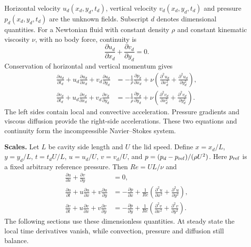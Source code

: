 Horizontal velocity $u_d(x_d,y_d,t_d)$, vertical velocity $v_d(x_d,y_d,t_d)$ and pressure $p_d(x_d,y_d,t_d)$ are the unknown fields. Subscript $d$ denotes dimensional quantities. For a Newtonian fluid with constant density $\rho$ and constant kinematic viscosity $\nu$, with no body force, continuity is
\[
\frac{\partial u_d}{\partial x_d}+\frac{\partial v_d}{\partial y_d}=0.
\]
Conservation of horizontal and vertical momentum gives
\begin{align*}
\frac{\partial u_d}{\partial t_d}+u_d\frac{\partial u_d}{\partial x_d}+v_d\frac{\partial u_d}{\partial y_d}
&=-\frac{1}{\rho}\frac{\partial p_d}{\partial x_d}+\nu\left(\frac{\partial^2u_d}{\partial x_d^2}+\frac{\partial^2u_d}{\partial y_d^2}\right),\\
\frac{\partial v_d}{\partial t_d}+u_d\frac{\partial v_d}{\partial x_d}+v_d\frac{\partial v_d}{\partial y_d}
&=-\frac{1}{\rho}\frac{\partial p_d}{\partial y_d}+\nu\left(\frac{\partial^2v_d}{\partial x_d^2}+\frac{\partial^2v_d}{\partial y_d^2}\right).
\end{align*}
The left sides contain local and convective acceleration. Pressure gradients and viscous diffusion provide the right-side accelerations. These two equations and continuity form the incompressible Navier--Stokes system.

\textbf{Scales.} Let $L$ be cavity side length and $U$ the lid speed. Define $x=x_d/L$, $y=y_d/L$, $t=t_dU/L$, $u=u_d/U$, $v=v_d/U$, and $p=(p_d-p_{\rm ref})/(\rho U^2)$. Here $p_{\rm ref}$ is a fixed arbitrary reference pressure. Then $Re=UL/\nu$ and
\begin{align*}
\frac{\partial u}{\partial x}+\frac{\partial v}{\partial y}&=0,\\
\frac{\partial u}{\partial t}+u\frac{\partial u}{\partial x}+v\frac{\partial u}{\partial y}
&=-\frac{\partial p}{\partial x}+\frac{1}{Re}\left(\frac{\partial^2u}{\partial x^2}+\frac{\partial^2u}{\partial y^2}\right),\\
\frac{\partial v}{\partial t}+u\frac{\partial v}{\partial x}+v\frac{\partial v}{\partial y}
&=-\frac{\partial p}{\partial y}+\frac{1}{Re}\left(\frac{\partial^2v}{\partial x^2}+\frac{\partial^2v}{\partial y^2}\right).
\end{align*}
The following sections use these dimensionless quantities. At steady state the local time derivatives vanish, while convection, pressure and diffusion still balance.

